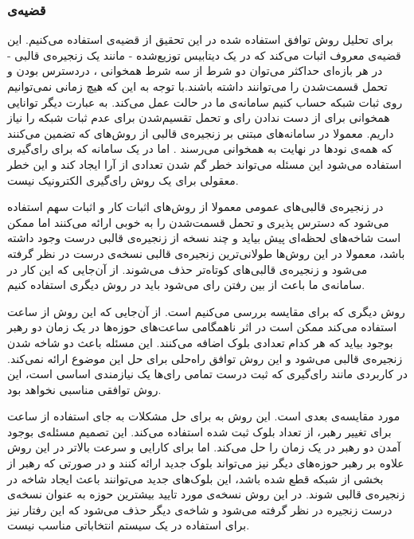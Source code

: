 \subsubsection{قضیه‌ی }
برای تحلیل روش توافق استفاده شده در این تحقیق از قضیه‌ی  استفاده می‌کنیم. این قضیه‌ی معروف 
\cite{CAP}
اثبات می‌کند که در یک دیتابیس توزیع‌شده - مانند یک زنجیره‌ی قالبی - در هر بازه‌ای حداکثر می‌توان دو شرط از سه شرط همخوانی 
، دردسترس بودن 
و تحمل قسمت‌شدن
را می‌توانند داشته باشند.با توجه به این که هیچ زمانی نمی‌توانیم روی ثبات شبکه حساب کنیم سامانه‌ی‌ ما در حالت  عمل می‌کند. به عبارت دیگر توانایی همخوانی برای از دست ندادن رای و تحمل تقسیم‌شدن برای عدم ثبات شبکه را نیاز داریم. معمولا در سامانه‌های مبتنی بر زنجیره‌ی قالبی از روش‌های  که تضمین می‌کنند که همه‌ی نودها در نهایت به همخوانی می‌رسند
.
اما در یک سامانه که برای رای‌گیری استفاده می‌شود این مسئله می‌تواند خطر گم شدن تعدادی از آرا ایجاد کند و این خطر معقولی برای یک‌ روش‌ رای‌گیری الکترونیک نیست.
\par
در زنجیره‌ی قالبی‌های عمومی معمولا از روش‌های اثبات کار و اثبات‌ سهم استفاده می‌شود که دسترس پذیری و تحمل قسمت‌شدن را به خوبی ارائه می‌کنند اما ممکن است شاخه‌های
لحظه‌ای پیش بیاید و چند نسخه از زنجیره‌ی قالبی درست وجود داشته باشد، معمولا در این روش‌ها طولانی‌ترین زنجیره‌ی قالبی نسخه‌ی درست در نظر گرفته می‌شود و زنجیره‌ی قالبی‌های کوتاه‌تر حذف می‌شوند. از آن‌جایی که این کار در سامانه‌ی ما باعث از بین رفتن رای‌ می‌شود باید در روش دیگری استفاده کنیم.
\par
روش دیگری که برای مقایسه بررسی می‌کنیم 
\cite{Aura}
است. از آن‌جایی که این روش از ساعت  استفاده می‌کند ممکن است در اثر ناهمگامی ساعت‌های حوزه‌ها در یک زمان دو رهبر بوجود بیاید که هر کدام تعدادی بلوک اضافه می‌کنند. این مسئله باعث دو شاخه شدن زنجیره‌ی قالبی می‌شود و این روش توافق راه‌حلی برای حل این موضوع ارائه نمی‌کند. در کاربردی مانند رای‌گیری که ثبت درست تمامی رای‌ها یک نیازمندی اساسی است، این روش توافقی مناسبی نخواهد بود.
\par
مورد مقایسه‌ی بعدی  
\cite{Clique}
است. این روش به برای حل مشکلات  به جای استفاده از ساعت برای تغییر رهبر، از تعداد بلوک ثبت شده استفاده می‌کند. این تصمیم مسئله‌ی بوجود آمدن دو رهبر در یک زمان را حل می‌کند. اما برای کارایی و سرعت بالاتر در این روش علاوه بر رهبر حوزه‌های دیگر نیز می‌تواند بلوک جدید ارائه کنند و در صورتی که رهبر از بخشی از شبکه قطع شده باشد، این بلوک‌های جدید می‌توانند باعث ایجاد شاخه در زنجیره‌ی قالبی شوند. در این روش نسخه‌ی مورد تایید بیشترین حوزه به عنوان نسخه‌ی درست زنجیره در نظر گرفته می‌شود و شاخه‌ی دیگر حذف می‌شود که این رفتار نیز برای استفاده در یک سیستم انتخاباتی مناسب نیست. 
\par

